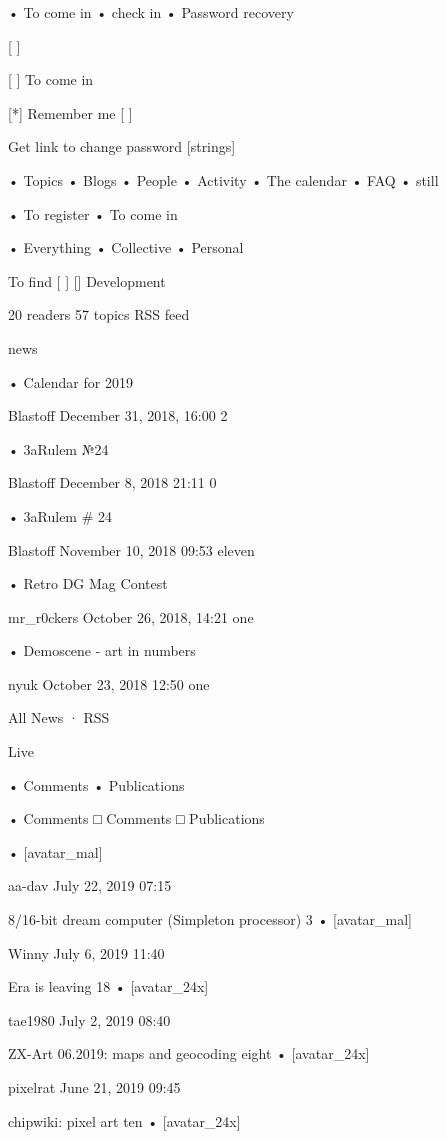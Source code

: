  

  • To come in
  • check in
  • Password recovery

[                    ]

[                    ] To come in

[*] Remember me 
[                    ]

Get link to change password
[strings]

  • Topics
  • Blogs
  • People
  • Activity
  • The calendar
  • FAQ
  • still

  • To register
  • To come in

  • Everything
  • Collective
  • Personal

To find
[                    ] []
Development

20 readers
57 topics
RSS feed

news

  • Calendar for 2019

    Blastoff December 31, 2018, 16:00 2

  • 3aRulem №24

    Blastoff December 8, 2018 21:11 0

  • 3aRulem # 24

    Blastoff November 10, 2018 09:53 eleven

  • Retro DG Mag Contest

    mr_r0ckers October 26, 2018, 14:21 one

  • Demoscene - art in numbers

    nyuk October 23, 2018 12:50 one

All News · RSS

Live

  • Comments
  • Publications

  • Comments
      □ Comments
      □ Publications

  • [avatar_mal]

    aa-dav July 22, 2019 07:15

    8/16-bit dream computer (Simpleton processor) 3
  • [avatar_mal]

    Winny July 6, 2019 11:40

    Era is leaving 18
  • [avatar_24x]

    tae1980 July 2, 2019 08:40

    ZX-Art 06.2019: maps and geocoding eight
  • [avatar_24x]

    pixelrat June 21, 2019 09:45

    chipwiki: pixel art ten
  • [avatar_24x]

